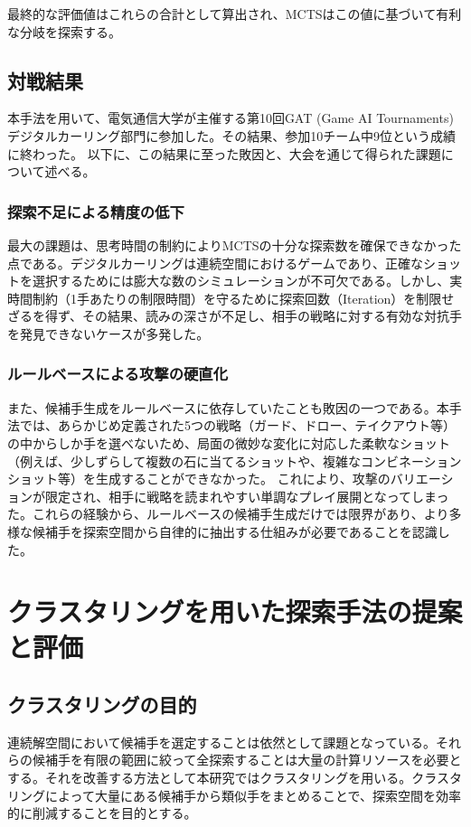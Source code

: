 \documentclass[11pt,a4j]{jreport}
\begin{document}
最終的な評価値はこれらの合計として算出され、MCTSはこの値に基づいて有利な分岐を探索する。

\section{対戦結果}
本手法を用いて、電気通信大学が主催する第10回GAT (Game AI Tournaments) デジタルカーリング部門に参加した。その結果、参加10チーム中9位という成績に終わった。
以下に、この結果に至った敗因と、大会を通じて得られた課題について述べる。

\subsection{探索不足による精度の低下}
最大の課題は、思考時間の制約によりMCTSの十分な探索数を確保できなかった点である。デジタルカーリングは連続空間におけるゲームであり、正確なショットを選択するためには膨大な数のシミュレーションが不可欠である。しかし、実時間制約（1手あたりの制限時間）を守るために探索回数（Iteration）を制限せざるを得ず、その結果、読みの深さが不足し、相手の戦略に対する有効な対抗手を発見できないケースが多発した。

\subsection{ルールベースによる攻撃の硬直化}
また、候補手生成をルールベースに依存していたことも敗因の一つである。本手法では、あらかじめ定義された5つの戦略（ガード、ドロー、テイクアウト等）の中からしか手を選べないため、局面の微妙な変化に対応した柔軟なショット（例えば、少しずらして複数の石に当てるショットや、複雑なコンビネーションショット等）を生成することができなかった。
これにより、攻撃のバリエーションが限定され、相手に戦略を読まれやすい単調なプレイ展開となってしまった。これらの経験から、ルールベースの候補手生成だけでは限界があり、より多様な候補手を探索空間から自律的に抽出する仕組みが必要であることを認識した。


\chapter[提案手法：Clustered MCTS]{クラスタリングを用いた探索手法の提案と評価}
\label{chap:proposed_method}
\section{クラスタリングの目的}
連続解空間において候補手を選定することは依然として課題となっている。それらの候補手を有限の範囲に絞って全探索することは大量の計算リソースを必要とする。それを改善する方法として本研究ではクラスタリングを用いる。クラスタリングによって大量にある候補手から類似手をまとめることで、探索空間を効率的に削減することを目的とする。
\end{document}
